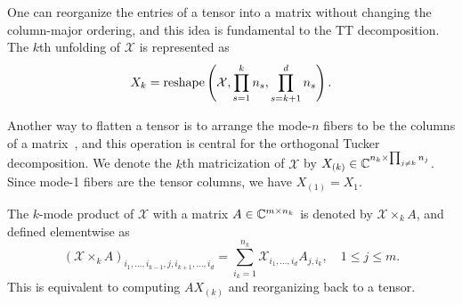 \documentclass[11pt,a4paper,review]{siamart220329}
\begin{document}
\begin{description}[leftmargin=*,noitemsep]
\item[Flattening by reshaping.]
One can reorganize the entries of a tensor into a matrix without changing the column-major ordering, and this idea is fundamental to the TT decomposition. The $k$th unfolding of $\mathcal{X}$ is represented as
\[X_k={\rm reshape}\left(\mathcal{X},\prod_{s=1}^k n_s,\prod_{s=k+1}^d n_s\right). \]

\item[Flattening via matricization.]
Another way to flatten a tensor is to arrange the mode-$n$ fibers to be the columns of a matrix~\cite{kolda2006multilinear}, and this operation is central for the orthogonal Tucker decomposition. We denote the $k$th matricization of $\mathcal{X}$ by $X_{(k)} \in \mathbb{C}^{n_k \times \prod_{j\neq k} n_j}$. Since mode-1 fibers are the tensor columns, we have $X_{(1)}=X_1$.

\item[The $k$-mode product.] The $k$-mode product of $\mathcal{X}$ with a matrix $A\in\mathbb{C}^{m \times n_k}$ is denoted by $\mathcal{X} \times_k A$, and defined elementwise as
\begin{equation}
(\mathcal{X} \times_k A)_{i_1,\ldots,i_{k-1},j,i_{k+1},\ldots,i_d} = \sum_{i_k = 1}^{n_k} \mathcal{X}_{i_1,\ldots,i_d}A_{j,i_k}, \quad 1 \le j \le m.
\label{eq:kfold}
\end{equation}
This is equivalent to computing $AX_{(k)}$ and reorganizing back to a tensor.

\end{description}
\end{document}
